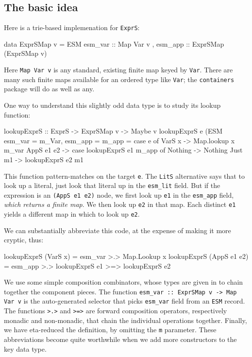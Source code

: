 \documentclass[acmsmall]{acmart}
\theoremstyle{theorem}
\theoremstyle{definition}
\theoremstyle{remark}
\begin{document}
\subsection{The basic idea} \label{sec:basic} \label{sec:alter}

Here is a trie-based implemenation for \lstinline{ExprS}:
\begin{code}
data ExprSMap v = ESM { esm_var :: Map Var v
                      , esm_app :: ExprSMap (ExprSMap v) }
\end{code}
Here \lstinline{Map Var v} is any standard, existing finite map keyed by \lstinline{Var}.
There are many such finite maps available for an ordered type like \lstinline{Var};
the \lstinline{containers} package will do as well as any.

One way to understand this slightly odd data type is to study its lookup function:
\begin{code}
lookupExprS :: ExprS -> ExprSMap v -> Maybe v
lookupExprS e (ESM { esm_var = m_Var, esm_app = m_app }
  = case e of
     VarS x     -> Map.lookup x m_var
     AppS e1 e2 -> case lookupExprS e1 m_app of
                     Nothing -> Nothing
                     Just m1 -> lookupExprS e2 m1
\end{code}
This function pattern-matches on the target \lstinline{e}.  The \lstinline{LitS} alternative
says that to look up a literal, just look that literal up in the \lstinline{esm_lit} field.
But if the expression is an \lstinline{(AppS e1 e2)} node, we first look up \lstinline{e1}
in the \lstinline{esm_app} field, \emph{which returns a finite map}.  We then look up \lstinline{e2}
in that map.  Each distinct \lstinline{e1} yields a different map in which to look up \lstinline{e2}.

We can substantially abbreviate this code, at the expense of making it more cryptic, thus:
\begin{code}
lookupExprS (VarS x)     = esm_var >.> Map.Lookup x
lookupExprS (AppS e1 e2) = esm_app >.> lookupExprS e1 >=> lookupExprS e2
\end{code}
We use some simple composition combinators, whose types are given in 
to chain together the component pieces.  The function \lstinline{esm_var :: ExprSMap v -> Map Var v}
is the auto-generated selector that picks \lstinline{esm_var} field from an \lstinline{ESM} record.
The functions \lstinline{>.>} and \lstinline{>=>} are forward composition
operators, respectively monadic and non-monadic, that chain the individual operations together.
Finally, we have eta-reduced the definition, by omitting the \lstinline{m} parameter.
These abbreviations become quite worthwhile when we add more constructors to the key data type.
\end{document}
